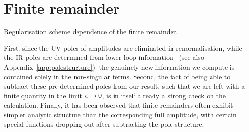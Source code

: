 \documentclass[main.tex]{subfiles}
\begin{document}
\section{Finite remainder} \label{sec:finrem}
Regularisation scheme dependence of the finite remainder.

First, since the UV poles of amplitudes are eliminated in renormalisation, while the IR poles are determined from lower-loop information~\cite{Catani:1998bh, Becher:2009cu, Becher:2009qa, Gardi:2009qi} (see also Appendix~\ref{app:polestructure}), the genuinely new information we compute is contained solely in the non-singular terms. Second, the fact of being able to subtract these pre-determined poles from our result, such that we are left with a finite quantity in the limit $\epsilon \rightarrow 0$, is in itself already a strong check on the calculation. Finally, it has been observed that finite remainders often exhibit simpler analytic structure than the corresponding full amplitude, with certain special functions dropping out after subtracting the pole structure. 
\end{document}
